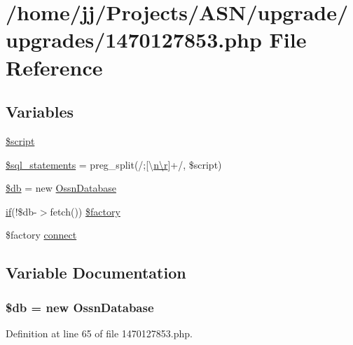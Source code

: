 \hypertarget{1470127853_8php}{}\section{/home/jj/\+Projects/\+A\+S\+N/upgrade/upgrades/1470127853.php File Reference}
\label{1470127853_8php}
\subsection*{Variables}
\begin{DoxyCompactItemize}
\item 
\hyperlink{1470127853_8php_af1de23de512bb5bf634c157dbb1b7758}{\$script}
\item 
\hyperlink{1470127853_8php_a3406d4f0fded9d6252687e02436fb38b}{\$sql\+\_\+statements} = preg\+\_\+split(\textquotesingle{}/;\mbox{[}\textbackslash{}\hyperlink{jquery-1_811_81_8min_8js_a96f65b399314d93896076ceb474b6b9b}{n\textbackslash{}r}\mbox{]}+/\textquotesingle{}, \$script)
\item 
\hyperlink{1470127853_8php_a1fa3127fc82f96b1436d871ef02be319}{\$db} = new \hyperlink{class_ossn_database}{Ossn\+Database}
\item 
\hyperlink{jquery_8tokeninput_8js_ad8dd46a3cbc004569e34401e9e71771a}{if}(!\$db-\/$>$fetch()) \hyperlink{1470127853_8php_a8673dc40c5d9d7451df660e451fbae86}{\$factory}
\item 
\$factory \hyperlink{1470127853_8php_a3fdbedd7713e458f25fcf7dc1f562a3d}{connect}
\end{DoxyCompactItemize}


\subsection{Variable Documentation}
\subsubsection[{\texorpdfstring{\$db}{$db}}]{\setlength{\rightskip}{0pt plus 5cm}\$db = new {\bf Ossn\+Database}}\hypertarget{1470127853_8php_a1fa3127fc82f96b1436d871ef02be319}{}\label{1470127853_8php_a1fa3127fc82f96b1436d871ef02be319}


Definition at line 65 of file 1470127853.\+php.

